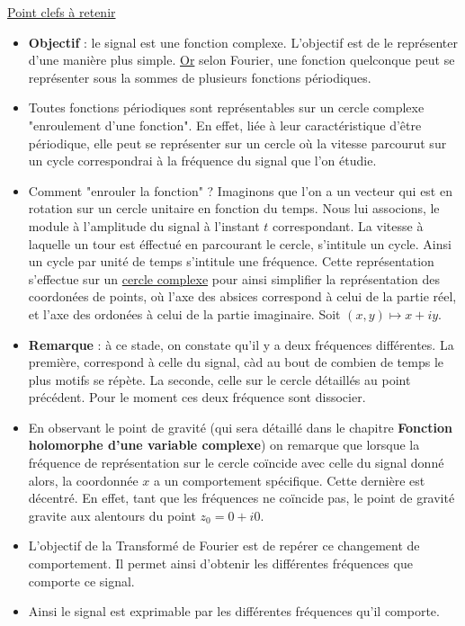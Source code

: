 \documentclass[a4paper]{book}
\begin{document}
\underline{Point clefs à retenir}
\begin{itemize}
	\item \textbf{Objectif} : le signal est une fonction complexe.
		L'objectif est de le représenter d'une manière plus simple.
		\underline{Or} selon Fourier, une fonction quelconque peut se
		représenter sous la sommes de plusieurs fonctions périodiques.
	\item Toutes fonctions périodiques sont représentables sur un cercle
		complexe "enroulement d'une fonction". En effet, liée à leur
		caractéristique d'être périodique, elle peut se représenter sur
		un cercle où la vitesse parcourut sur un  cycle correspondrai à 
		la fréquence du signal que l'on étudie.
	\item Comment "enrouler la fonction" ? Imaginons que l'on a un vecteur
		qui est en rotation sur un cercle unitaire en fonction du temps.
		Nous lui associons, le module à l'amplitude du signal à
		l'instant $t$ correspondant. La vitesse à laquelle un tour est
		éffectué en parcourant le cercle, s'intitule un cycle. Ainsi un
		cycle par unité de temps s'intitule une fréquence. Cette
		représentation s'effectue sur un \underline{cercle complexe}
		pour ainsi simplifier la représentation des coordonées de
		points, où l'axe des absices correspond à celui de la partie
		réel, et l'axe des ordonées à celui de la partie imaginaire.
		Soit $(x,y) \mapsto x+iy$.
	\item \textbf{Remarque} : à ce stade, on constate qu'il y a deux
		fréquences différentes. La première, correspond à celle du
		signal, càd au bout de combien de temps le plus motifs se
		répète. La seconde, celle sur le cercle détaillés au point
		précédent. Pour le moment ces deux fréquence sont dissocier.
	\item En observant le point de gravité (qui sera détaillé dans le
		chapitre \textbf{Fonction holomorphe d'une variable complexe})
		on remarque que lorsque la fréquence
		de représentation sur le cercle coïncide avec celle du signal
		donné alors, la coordonnée $x$ a un comportement spécifique.
		Cette dernière est décentré. En effet, tant que les fréquences
		ne coïncide pas, le point de gravité gravite aux alentours du
		point $z_{0} = 0+i0$.
	\item L'objectif de la Transformé de Fourier est de repérer ce
		changement de comportement. Il permet ainsi d'obtenir les
		différentes fréquences que comporte ce signal.
	\item Ainsi le signal est exprimable par les différentes fréquences qu'il
		comporte.
\end{itemize}
\end{document}
